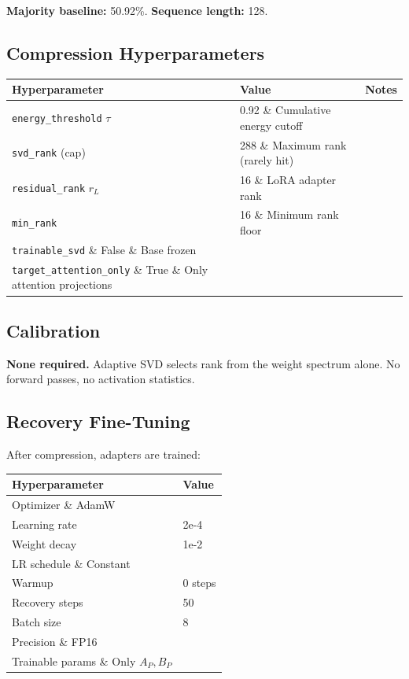 \textbf{Majority baseline:} 50.92\%. \textbf{Sequence length:} 128.

\subsection{Compression Hyperparameters}

\begin{table}[H]
\centering
\small
\begin{tabular}{lll}
\toprule
\textbf{Hyperparameter} & \textbf{Value} & \textbf{Notes} \\
\midrule
\texttt{energy\_threshold} $\tau$ & 0.92 \& Cumulative energy cutoff \\
\texttt{svd\_rank} (cap) & 288 \& Maximum rank (rarely hit) \\
\texttt{residual\_rank} $r_L$ & 16 \& LoRA adapter rank \\
\texttt{min\_rank} & 16 \& Minimum rank floor \\
\texttt{trainable\_svd} \& False \& Base frozen \\
\texttt{target\_attention\_only} \& True \& Only attention projections \\
\bottomrule
\end{tabular}
\end{table}

\subsection{Calibration}

\textbf{None required.} Adaptive SVD selects rank from the weight spectrum alone. 
No forward passes, no activation statistics.

\subsection{Recovery Fine-Tuning}

After compression, adapters are trained:

\begin{table}[H]
\centering
\small
\begin{tabular}{ll}
\toprule
\textbf{Hyperparameter} & \textbf{Value} \\
\midrule
Optimizer \& AdamW \\
Learning rate & 2e-4 \\
Weight decay & 1e-2 \\
LR schedule \& Constant \\
Warmup & 0 steps \\
Recovery steps & 50 \\
Batch size & 8 \\
Precision \& FP16 \\
Trainable params \& Only $A_P, B_P$ \\
\bottomrule
\end{tabular}
\end{table}

